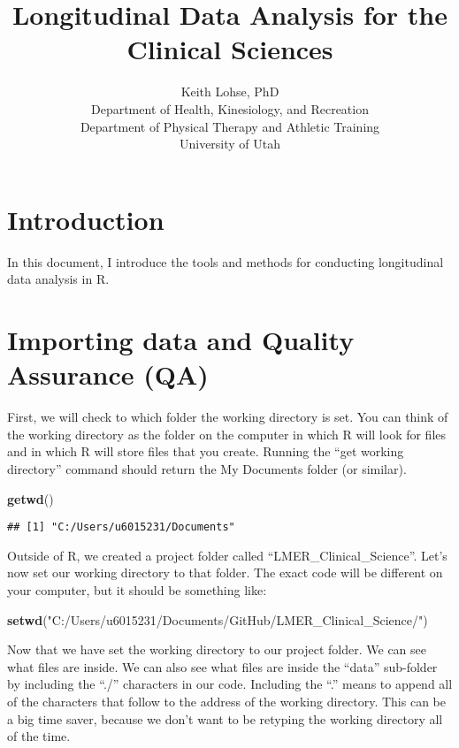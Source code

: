 \documentclass[]{article}
\title{Longitudinal Data Analysis for the Clinical Sciences}
\author{Keith Lohse, PhD\\
Department of Health, Kinesiology, and Recreation\\
Department of Physical Therapy and Athletic Training\\
University of Utah}
\date{}
\newenvironment{Shaded}{\begin{snugshade}}{\end{snugshade}}
\newcommand{\KeywordTok}[1]{\textcolor[rgb]{0.13,0.29,0.53}{\textbf{{#1}}}}
\newcommand{\StringTok}[1]{\textcolor[rgb]{0.31,0.60,0.02}{{#1}}}
\newcommand{\NormalTok}[1]{{#1}}
\begin{document}
\maketitle

\section{Introduction}\label{introduction}

In this document, I introduce the tools and methods for conducting
longitudinal data analysis in R.

\section{Importing data and Quality Assurance
(QA)}\label{importing-data-and-quality-assurance-qa}

First, we will check to which folder the working directory is set. You
can think of the working directory as the folder on the computer in
which R will look for files and in which R will store files that you
create. Running the ``get working directory'' command should return the
My Documents folder (or similar).

\begin{Shaded}
\begin{Highlighting}[]
\KeywordTok{getwd}\NormalTok{()}
\end{Highlighting}
\end{Shaded}

\begin{verbatim}
## [1] "C:/Users/u6015231/Documents"
\end{verbatim}

Outside of R, we created a project folder called
``LMER\_Clinical\_Science''. Let's now set our working directory to that
folder. The exact code will be different on your computer, but it should
be something like:

\begin{Shaded}
\begin{Highlighting}[]
\KeywordTok{setwd}\NormalTok{(}\StringTok{"C:/Users/u6015231/Documents/GitHub/LMER_Clinical_Science/"}\NormalTok{)}
\end{Highlighting}
\end{Shaded}

Now that we have set the working directory to our project folder. We can
see what files are inside. We can also see what files are inside the
``data'' sub-folder by including the ``./'' characters in our code.
Including the ``.'' means to append all of the characters that follow to
the address of the working directory. This can be a big time saver,
because we don't want to be retyping the working directory all of the
time.
\end{document}

